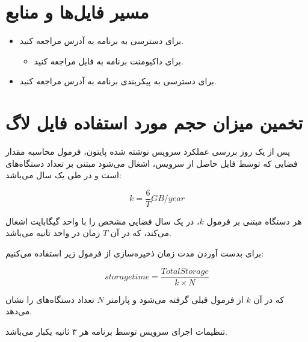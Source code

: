 \documentclass[a4paper]{article}
\begin{document}
\section{مسیر فایل‌ها و منابع}

\begin{itemize}
    \item برای دسترسی به برنامه  به آدرس
     مراجعه کنید.
    \begin{itemize}
        \item برای داکیومنت برنامه به فایل  مراجعه کنید.
    \end{itemize}
    \item برای دسترسی به پیکربندی  برنامه  به آدرس
     مراجعه کنید.
\end{itemize}

\section{تخمین میزان حجم مورد استفاده فایل لاگ}

پس از یک روز بررسی عملکرد سرویس نوشته شده پایتون، فرمول محاسبه مقدار فضایی که
توسط فایل  حاصل از سرویس، اشغال می‌شود مبتنی بر تعداد دستگاه‌های
 است و در طی یک سال می‌باشد:

\begin{equation}
    k = \frac{6}{T} GB/year
\end{equation}

هر دستگاه  مبتنی بر فرمول $k$، در یک سال فضایی مشخص را با واحد گیگابایت
اشغال می‌کند، که در آن $T$ زمان در واحد ثانیه می‌باشد.

برای بدست آوردن مدت زمان ذخیره‌سازی از فرمول زیر استفاده می‌کنیم:

\begin{equation}
    storage time = \frac{Total Storage}{k \times N}    
\end{equation}

که در آن $k$ از فرمول قبلی گرفته می‌شود و پارامتر $N$ تعداد دستگاه‌های 
را نشان می‌دهد.

تنظیمات اجرای سرویس توسط برنامه  هر ۳ ثانیه یکبار می‌باشد.
\end{document}

